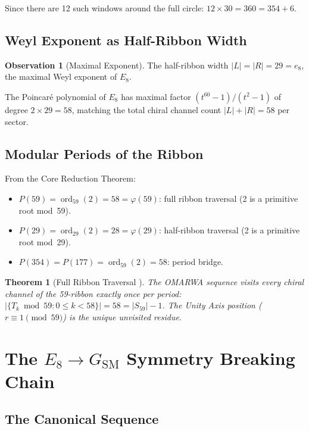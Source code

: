 \documentclass[11pt, a4paper]{article}
\theoremstyle{plain}
\newtheorem{theorem}{Theorem}[section]
\theoremstyle{definition}
\newtheorem{observation}{Observation}[section]
\theoremstyle{remark}
\newcommand{\ord}{\operatorname{ord}}
\begin{document}
Since there are 12 such windows around the full circle:
$12 \times 30 = 360 = 354 + 6$.

\subsection{Weyl Exponent as Half-Ribbon Width}

\begin{observation}[Maximal Exponent]
\label{obs:maxexp}
The half-ribbon width $|L| = |R| = 29 = e_8$, the maximal Weyl
exponent of $E_8$.
\end{observation}

The Poincar\'e polynomial of $E_8$ has maximal factor
$(t^{60}-1)/(t^2-1)$ of degree $2 \times 29 = 58$, matching the
total chiral channel count $|L| + |R| = 58$ per sector.

\subsection{Modular Periods of the Ribbon}

From the Core Reduction Theorem:
\begin{itemize}
  \item $P(59) = \ord_{59}(2) = 58 = \varphi(59)$: full ribbon
    traversal (2 is a primitive root mod~59).
  \item $P(29) = \ord_{29}(2) = 28 = \varphi(29)$: half-ribbon
    traversal (2 is a primitive root mod~29).
  \item $P(354) = P(177) = \ord_{59}(2) = 58$: period bridge.
\end{itemize}

\begin{theorem}[Full Ribbon Traversal {\cite[Thm.~9.2]{paket2}}]
The OMARWA sequence visits every chiral channel of the 59-ribbon
exactly once per period:
$|\{T_k \bmod 59 : 0 \leq k < 58\}| = 58 = |S_{59}| - 1$.
The Unity Axis position ($r \equiv 1 \pmod{59}$) is the unique
unvisited residue.
\end{theorem}

\section{The $E_8 \to G_{\mathrm{SM}}$ Symmetry Breaking Chain}
\label{sec:breaking}

\subsection{The Canonical Sequence}
\end{document}
